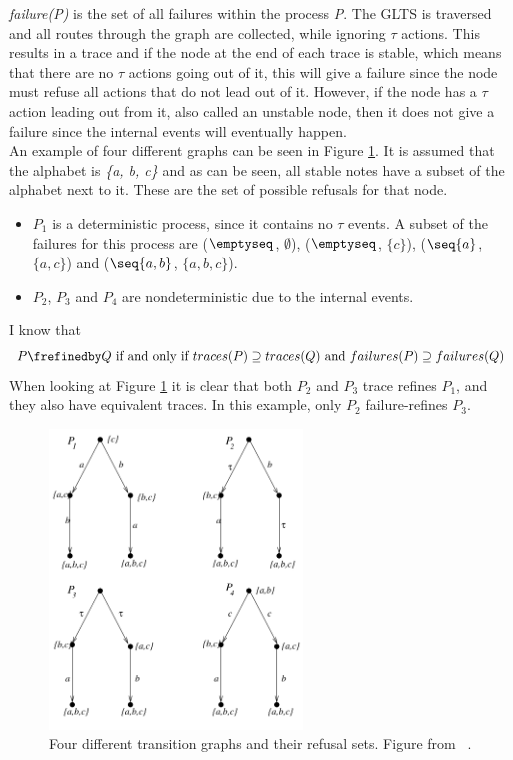 \textit{failure(P)} is the set of all failures within the process \textit{P}. The GLTS is traversed and all routes through the graph are collected, while ignoring $\tau$ actions. This results in a trace and if the node at the end of each trace is stable, which means that there are no $\tau$ actions going out of it, this will give a failure since the node must refuse all actions that do not lead out of it. However, if the node has a $\tau$ action leading out from it, also called an unstable node, then it does not give a failure since the internal events will eventually happen.\\

An example of four different graphs can be seen in Figure \ref{fig:failures_graph}. It is assumed that the alphabet is \textit{\{a, b, c\}} and as can be seen, all stable notes have a subset of the alphabet next to it. These are the set of possible refusals for that node.
\begin{itemize}
    \item $P_1$ is a deterministic process, since it contains no $\tau$ events. A subset of the failures for this process are ($\emptyseq$, $\emptyset$), ($\emptyseq$, $\{c\}$), ($\seq{a}$, $\{a,c\}$) and ($\seq{a,b}$, $\{a,b,c\}$).
    \item $P_2$, $P_3$ and $P_4$ are nondeterministic due to the internal events.
\end{itemize}
I know that $$P \frefinedby Q \text{ if and only if } traces(P) \supseteq traces(Q) \text{ and } failures(P) \supseteq failures(Q)$$
When looking at Figure \ref{fig:failures_graph} it is clear that both $P_2$ and $P_3$ trace refines $P_1$, and they also have equivalent traces. In this example, only $P_2$ failure-refines $P_3$.
\begin{figure}[h]
\centering
\includegraphics[width=0.6\textwidth]{figures/failures_graph.jpg}
\caption{Four different transition graphs and their refusal sets. Figure from ~\cite{Roscoe2010}.}
\label{fig:failures_graph}
\end{figure}
